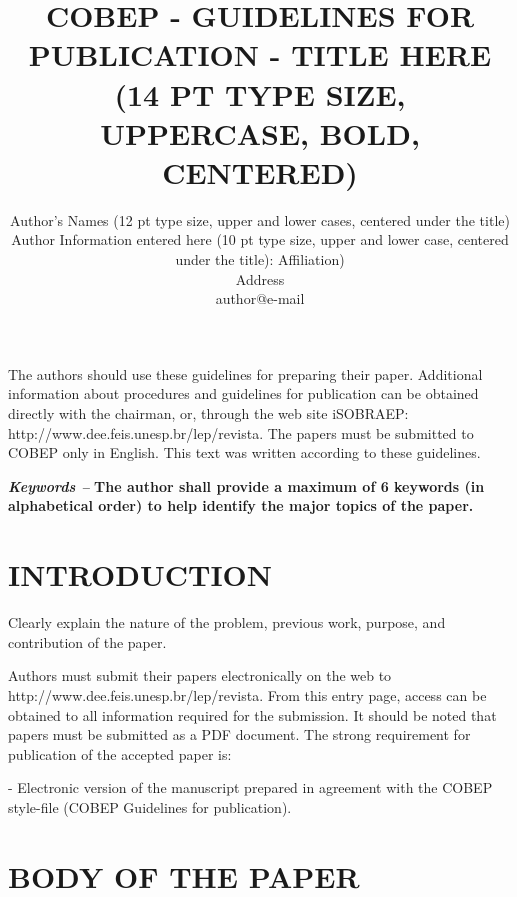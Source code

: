 \documentclass[10pt,twoside,a4paper]{article}
\begin{document}
\title{\textbf{COBEP - GUIDELINES FOR PUBLICATION - TITLE HERE \\(14 PT TYPE SIZE, UPPERCASE, BOLD, CENTERED)}}


\author{Author’s Names (12 pt type size, upper and lower cases, centered under the title)
\\\normalsize Author Information entered here (10 pt type size, upper and lower case, centered under the title): Affiliation)
\\\normalsize Address
\\\normalsize author@e-mail}
\maketitle

\begin{abstracttext}
 The authors should use these guidelines for preparing their paper. Additional information about procedures and guidelines for publication can be obtained directly with the chairman, or, through the web site iSOBRAEP: http://www.dee.feis.unesp.br/lep/revista. The papers must be submitted to COBEP only in English. This text was written according to these guidelines.
\end{abstracttext} 


\vspace{10pt} \emph{\textbf{\textit{Keywords -- }}}\textbf{The author shall provide a maximum of 6 keywords (in alphabetical order) to help identify the major topics of the paper.}

\section{INTRODUCTION}

Clearly explain the nature of the problem, previous work, purpose, and contribution of the paper.

Authors must submit their papers electronically on the web to http://www.dee.feis.unesp.br/lep/revista. From this entry page, access can be obtained to all information required for the submission. It should be noted that papers must be submitted as a PDF document. The strong requirement for publication of the accepted paper is: 

- Electronic version of the manuscript prepared in agreement with the COBEP style-file (COBEP Guidelines for publication).

\section{BODY OF THE PAPER}
\end{document}
